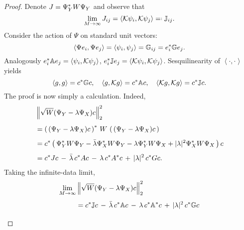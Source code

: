 \begin{proof}
    Denote $J = \Psi_Y^* W \Psi_Y$ and observe that
    \begin{equation}
        \label{eq:J}
        \lim_{M \to \infty} J_{i j} = 
        \left\langle \scrK \psi_i, \scrK \psi_j \right\rangle \eqdef \bbJ_{i j} . 
    \end{equation}
    Consider the action of $\Psi$ on standard unit vectors:
    \begin{equation}
        \left\langle \Psi e_i, \Psi e_j \right\rangle 
        = \left\langle \psi_i, \psi_j \right\rangle 
        = \mathbb{G}_{i j} 
        = e_i^* \mathbb{G} e_j . 
    \end{equation}
    Analogously $e_i^* \mathbb{A} e_j = \left\langle \psi_i, \mathcal{K} \psi_j \right\rangle$, 
    $e_i^* \mathbb{J} e_j = \left\langle \mathcal{K} \psi_i, \mathcal{K} \psi_j \right\rangle$. 
    Sesquilinearity of $\left\langle \cdot, \cdot \right\rangle$ yields 
    \begin{equation}
        \left\langle g, g \right\rangle = c^* \mathbb{G} c, \quad 
        \left\langle g, \mathcal{K} g \right\rangle = c^* \mathbb{A} c, \quad 
        \left\langle \mathcal{K} g, \mathcal{K} g \right\rangle = c^* \mathbb{J} c . 
    \end{equation}
    The proof is now simply a calculation. Indeed,
    \begin{equation}
        \label{eq:reg_error}
        \begin{split}
            &\left\| \sqrt{W} ( \Psi_Y - \lambda \Psi_X ) c \right\|_2^2 \\[1ex]
            &= \left(\, ( \Psi_Y - \lambda \Psi_X ) c \,\right)^* \,W\, \left(\, ( \Psi_Y - \lambda \Psi_X ) c \,\right) \\[1ex]
            &= c^* \left(\, 
                \Psi_Y^* W \Psi_Y - \bar{\lambda} \Psi_X^* W \Psi_Y - \lambda \Psi_Y^* W \Psi_X + | \lambda |^2 \Psi_X^* W \Psi_X \,\right) c \\[1ex]
            &= c^* J c \,-\, \bar{\lambda}\, c^* A c \,-\, \lambda\, c^* A^* c \,+\, | \lambda |^2\, c^* G c . 
        \end{split}
    \end{equation}
    Taking the infinite-data limit,
    \begin{equation}
        \label{eq:residual}
        \begin{split}
            \lim_{M \to \infty} & \left\| \sqrt{W} ( \YY - \lambda \YX ) c \right\|_2^2 \\[1ex]
            &= c^* \bbJ c \,-\, \bar{\lambda} \,c^* \bbA c \,-\, \lambda\, c^* \bbA^* c \,+\, | \lambda |^2\, c^* \bbG c \\[1.2ex]

\end{split}
\end{equation}
\end{proof}
